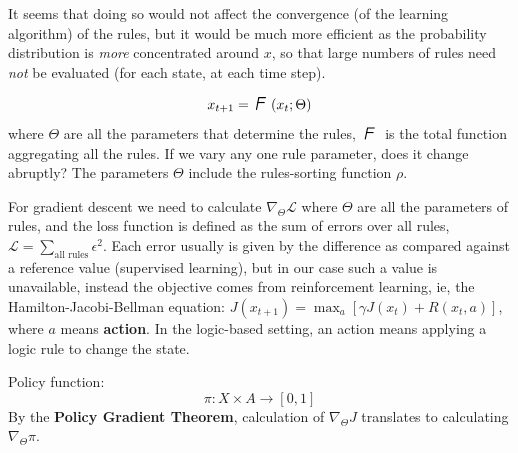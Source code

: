 It seems that doing so would not affect the convergence (of the learning algorithm) of the rules, but it would be much more efficient as the probability distribution is \textit{more} concentrated around $x$, so that large numbers of rules need \textit{not} be evaluated (for each state, at each time step).


\begin{equation}
x_{t+1} = \squareF(x_t; \Theta)
\end{equation}
where $\Theta$ are all the parameters that determine the rules, $\squareF$ is the total function aggregating all the rules.  If we vary any one rule parameter, does it change abruptly?  The parameters $\Theta$ include the rules-sorting function $\rho$.

For gradient descent we need to calculate $\nabla_\Theta \mathcal{L}$ where $\Theta$ are all the parameters of rules, and the loss function is defined as the sum of errors over all rules, $\displaystyle \mathcal{L} = \sum_{\text{all rules}} \epsilon^2 $.  Each error usually is given by the difference as compared against a reference value (supervised learning), but in our case such a value is unavailable, instead the objective comes from reinforcement learning, ie, the Hamilton-Jacobi-Bellman equation:  $\displaystyle J(x_{t+1}) = \max_a [ \gamma J(x_t) + R(x_t,a) ] $, where $a$ means \textbf{action}.  In the logic-based setting, an action means applying a logic rule to change the state.  

Policy function:
\begin{equation}
\pi: X \times A \rightarrow [0,1]
\end{equation}
By the \textbf{Policy Gradient Theorem}, calculation of $\nabla_\Theta J$ translates to calculating $\nabla_\Theta \pi$.

